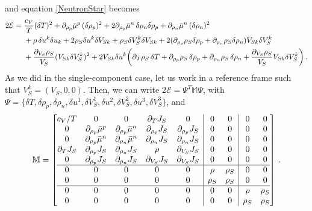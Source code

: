 \documentclass[a4paper, amsfonts, amssymb, amsmath, reprint, showkeys, nofootinbib, twoside,notitlepage,onecolumn]{revtex4-2}
\theoremstyle{definition}
\theoremstyle{theorem}
\theoremstyle{corollary}
\begin{document}
and equation \eqref{NeutronStar} becomes
\begin{equation}\label{NeutronStar2}
\begin{split}
2\mathcal{E}={}& \dfrac{c_V}{T} (\delta T)^2  +\partial_{\rho_p} \Bar{\mu}^p \, (\delta \rho_p)^2+2\partial_{\rho_p} \Bar{\mu}^n \, \delta \rho_n \delta \rho_p+\partial_{\rho_n} \Bar{\mu}^n \, (\delta \rho_n)^2 \\ 
&+ \rho\,\delta u^k \delta u_k+2 \rho_{S} \delta u^k  \delta  V_{Sk}+ \rho_{S} \delta V^{k}_S\delta V_{Sk}+2(\partial_{\rho_p} \rho_S  \delta \rho_p +\partial_{\rho_n} \rho_S  \delta \rho_n) V_{Sk} \delta  V_S^{k}  \\ 
& +\dfrac{\partial_{V_S}\rho_S}{V_S}(V_{Sk} 
 \delta V_S^{k})^2+2 V_{Sk} \delta u^k  \bigg( \partial_T \rho_S \, \delta T +\partial_{\rho_p} \rho_S \, \delta \rho_p +\partial_{\rho_n} \rho_S \, \delta \rho_n +\dfrac{\partial_{V_S}\rho_S}{V_S}V_{Sk} 
 \delta V_S^{k} \bigg) \, . \\
\end{split}  
\end{equation}
As we did in the single-component case, let us work in a reference frame such that $V_S^k=(V_S,0,0)$. Then, we can write $2\mathcal{E}=\Psi^T \mathbb{M}\Psi$, with $\Psi=\{\delta T, \delta\rho_p,\delta \rho_n, \delta u^1, \delta V_S^1, \delta u^2, \delta V_S^2,\delta u^3, \delta V_S^3\}$, and
\begin{equation}
\mathbb{M} =
\left[
\begin{array}{@{}ccccc|cc|cc@{}}
c_V/T & 0 & 0 & \partial_T J_S & 0 & 0 & 0 & 0 & 0\\
0 & \partial_{\rho_p} \Bar{\mu}^p & \partial_{\rho_p} \Bar{\mu}^n & \partial_{\rho_p} J_S & \partial_{\rho_p} J_S & 0 & 0 & 0 & 0 \\
0 & \partial_{\rho_p} \Bar{\mu}^n & \partial_{\rho_n} \Bar{\mu}^n & \partial_{\rho_n} J_S &  \partial_{\rho_n} J_S & 0 & 0 & 0 & 0\\
\partial_T J_S & \partial_{\rho_p} J_S& \partial_{\rho_n} J_S & \rho & \partial_{V_S}J_S & 0 & 0 & 0 & 0\\
0 & \partial_{\rho_p} J_S & \partial_{\rho_n} J_S & \partial_{V_S}J_S &  \partial_{V_S}J_S & 0 & 0 & 0 & 0\\
\hline
0 & 0& 0 & 0 & 0 & \rho & \rho_S & 0 & 0\\
0 & 0& 0 & 0 & 0 & \rho_S & \rho_S & 0 & 0\\
\hline
0 & 0& 0 & 0 & 0 & 0 & 0 & \rho & \rho_S \\
0 & 0&  0 & 0 & 0 & 0 & 0 & \rho_S & \rho_S \\
\end{array} 
\right] \, .
\end{equation}
\end{document}
